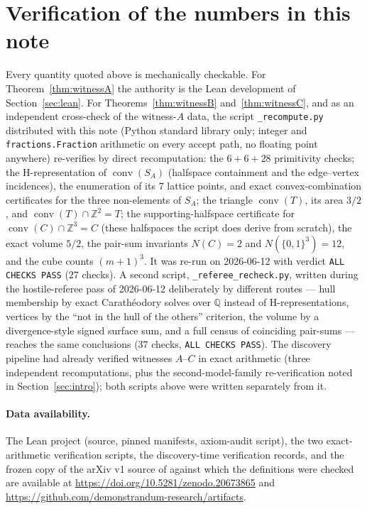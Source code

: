 \documentclass[11pt]{article}
\theoremstyle{remark}
\newcommand{\Z}{\mathbb{Z}}
\newcommand{\conv}{\operatorname{conv}}
\begin{document}
\section{Verification of the numbers in this note}\label{sec:verification}

Every quantity quoted above is mechanically checkable. For
Theorem~\ref{thm:witnessA} the authority is the Lean development of
Section~\ref{sec:lean}. For Theorems~\ref{thm:witnessB}
and~\ref{thm:witnessC}, and as an independent cross-check of the witness-$A$
data, the script \texttt{\_recompute.py} distributed with this note (Python
standard library only; integer and \texttt{fractions.Fraction} arithmetic on
every accept path, no floating point anywhere) re-verifies by direct
recomputation: the $6 + 6 + 28$ primitivity checks; the
H-representation of $\conv(S_A)$ (halfspace containment and the edge--vertex
incidences), the enumeration of its $7$ lattice points, and exact
convex-combination certificates for the three non-elements of $S_A$; the
triangle $\conv(T)$, its area $3/2$, and $\conv(T) \cap \Z^2 = T$; the
supporting-halfspace certificate for $\conv(C) \cap \Z^3 = C$ (these
halfspaces the script does derive from scratch), the exact
volume $5/2$, the pair-sum invariants $N(C) = 2$ and $N(\{0,1\}^3) = 12$,
and the cube counts $(m+1)^3$. It was re-run on 2026-06-12 with verdict
\texttt{ALL CHECKS PASS} ($27$ checks). A second script,
\texttt{\_referee\_recheck.py}, written during the hostile-referee pass of
2026-06-12 deliberately by different routes --- hull membership by exact
Carath\'eodory solves over $\mathbb{Q}$ instead of H-representations,
vertices by the ``not in the hull of the others'' criterion, the volume by a
divergence-style signed surface sum, and a full census of coinciding
pair-sums --- reaches the same conclusions ($37$ checks,
\texttt{ALL CHECKS PASS}). The discovery pipeline had already verified
witnesses $A$--$C$ in exact arithmetic (three independent recomputations,
plus the second-model-family re-verification noted in
Section~\ref{sec:intro}); both scripts above were written separately from
it.

\paragraph{Data availability.}
The Lean project (source, pinned manifests, axiom-audit script), the two
exact-arithmetic verification scripts, the discovery-time verification
records, and the frozen copy of the arXiv v1 source of \cite{BDLT2025}
against which the definitions were checked are available at
\url{https://doi.org/10.5281/zenodo.20673865} and
\url{https://github.com/demonstrandum-research/artifacts}.
\end{document}
